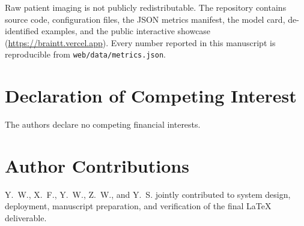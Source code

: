\documentclass[11pt,a4paper]{article}
\begin{document}
Raw patient imaging is not publicly redistributable. The repository contains source code, configuration files, the JSON metrics manifest, the model card, de-identified examples, and the public interactive showcase (\url{https://braintt.vercel.app}). Every number reported in this manuscript is reproducible from \texttt{web/data/metrics.json}.

\section*{Declaration of Competing Interest}

The authors declare no competing financial interests.

\section*{Author Contributions}

Y.~W., X.~F., Y.~W., Z.~W., and Y.~S. jointly contributed to system design, deployment, manuscript preparation, and verification of the final LaTeX deliverable.
\end{document}
